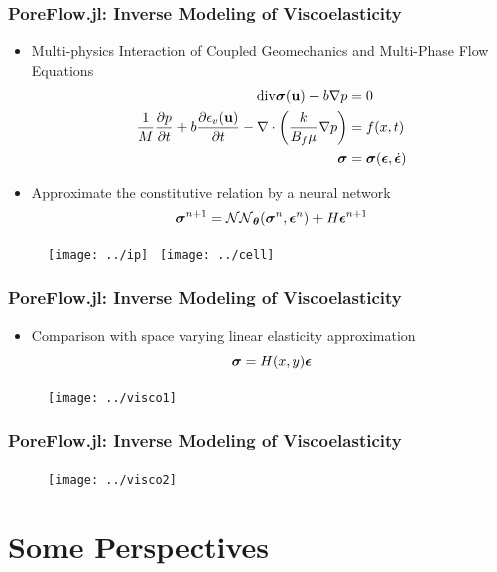 \documentclass{beamer}
\newcommand{\bt}[0]{\bm{\theta}}
\newcommand{\bu}{\mathbf{u}}
\begin{document}
\begin{frame}
	\frametitle{PoreFlow.jl: Inverse Modeling of Viscoelasticity}
%	
	\begin{itemize}
		\item Multi-physics Interaction of Coupled Geomechanics and Multi-Phase Flow Equations 
{\small
\begin{align*}
\mathrm{div}\bsigma(\bu) - b \nabla p &= 0\\
    \frac{1}{M} \frac{\partial p}{\partial t} + b\frac{\partial \epsilon_v(\bu)}{\partial t} - \nabla\cdot\left(\frac{k}{B_f\mu}\nabla p\right) &= f(x,t)	\\
    	\bsigma &= \bsigma(\bepsilon, \dot\bepsilon)
\end{align*}
}
\item Approximate the constitutive relation by a neural network
{\small
$$\bsigma^{n+1} = \mathcal{NN}_{\bt} (\bsigma^n, \bepsilon^n) + H\bepsilon^{n+1}$$}
	\end{itemize}		
	\begin{figure}[hbt]	
	\centering
  \texttt{[image: ../ip]}~
  \texttt{[image: ../cell]}
\end{figure}

\end{frame}


\begin{frame}
	\frametitle{PoreFlow.jl: Inverse Modeling of Viscoelasticity}
	
	\begin{itemize}
		\item Comparison with space varying linear elasticity approximation
		\begin{equation}
			\bm{\sigma} = H(x, y) \bm{\epsilon}
		\end{equation}
	\end{itemize}
	\begin{figure}[hbt]
  \texttt{[image: ../visco1]}
\end{figure}

\end{frame}

\begin{frame}
	\frametitle{PoreFlow.jl: Inverse Modeling of Viscoelasticity}
	\begin{figure}[hbt]
  \texttt{[image: ../visco2]}
\end{figure}

\end{frame}



\section{Some Perspectives}
\end{document}
